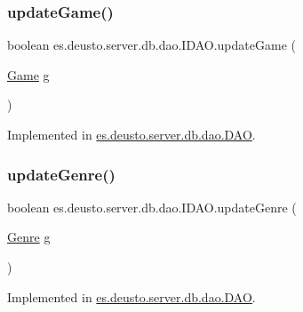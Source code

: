 \subsubsection{\texorpdfstring{update\+Game()}{updateGame()}}
{\footnotesize\ttfamily boolean es.\+deusto.\+server.\+db.\+dao.\+I\+D\+A\+O.\+update\+Game (\begin{DoxyParamCaption}\item[{\hyperlink{classes_1_1deusto_1_1server_1_1db_1_1data_1_1_game}{Game}}]{g }\end{DoxyParamCaption})}



Implemented in \hyperlink{classes_1_1deusto_1_1server_1_1db_1_1dao_1_1_d_a_o_ae7540010b43f96c5e50995a8376614e7}{es.\+deusto.\+server.\+db.\+dao.\+D\+AO}.

\mbox{\label{interfacees_1_1deusto_1_1server_1_1db_1_1dao_1_1_i_d_a_o_ae989ff2681d6afe8651a595340265c39}} 
\subsubsection{\texorpdfstring{update\+Genre()}{updateGenre()}}
{\footnotesize\ttfamily boolean es.\+deusto.\+server.\+db.\+dao.\+I\+D\+A\+O.\+update\+Genre (\begin{DoxyParamCaption}\item[{\hyperlink{classes_1_1deusto_1_1server_1_1db_1_1data_1_1_genre}{Genre}}]{g }\end{DoxyParamCaption})}



Implemented in \hyperlink{classes_1_1deusto_1_1server_1_1db_1_1dao_1_1_d_a_o_ae08384fb32fa6936c93f6292dbe02c7e}{es.\+deusto.\+server.\+db.\+dao.\+D\+AO}.

\mbox{\label{interfacees_1_1deusto_1_1server_1_1db_1_1dao_1_1_i_d_a_o_a601329b95123948b10c3232687b11d5b}} 
